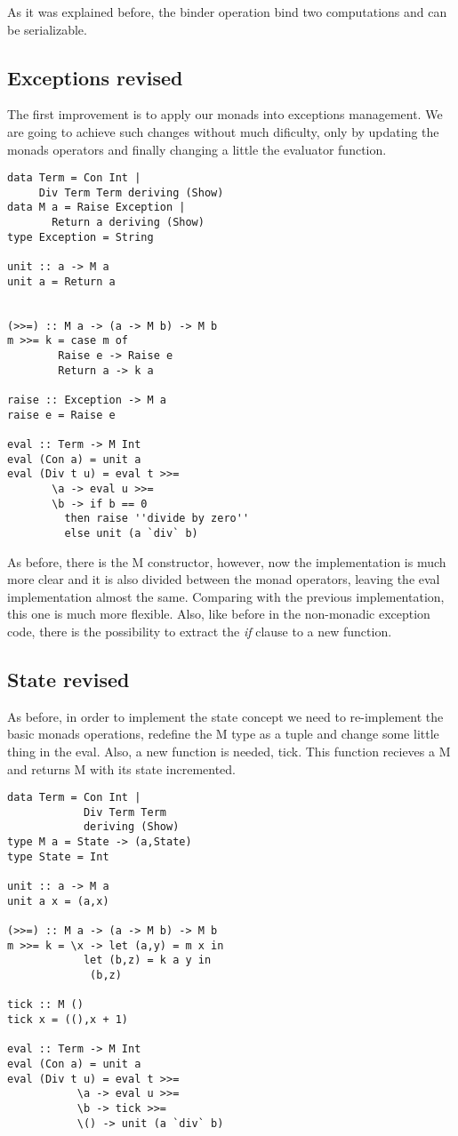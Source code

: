 \documentclass[twocolumn,10pt]{article}
\begin{document}
As it was explained before, the binder operation bind two computations and can be serializable.

\subsection{Exceptions revised}
The first improvement is to apply our monads into exceptions management. We are going to achieve such changes without much dificulty, only by updating the monads operators and finally changing a little the evaluator function.

\lstset{language=Haskell}
\begin{lstlisting}
data Term = Con Int | 
     Div Term Term deriving (Show)
data M a = Raise Exception | 
	   Return a deriving (Show)
type Exception = String

unit :: a -> M a
unit a = Return a


(>>=) :: M a -> (a -> M b) -> M b
m >>= k = case m of
		Raise e -> Raise e
		Return a -> k a

raise :: Exception -> M a
raise e = Raise e

eval :: Term -> M Int
eval (Con a) = unit a
eval (Div t u) = eval t >>= 
	   \a -> eval u >>= 
	   \b -> if b == 0
         then raise ''divide by zero''
         else unit (a `div` b)
\end{lstlisting}

As before, there is the M constructor, however, now the implementation is much more clear and it is also divided between the monad operators, leaving the eval implementation almost the same. Comparing with the previous implementation, this one is much more flexible. Also, like before in the non-monadic exception code, there is the possibility to extract the \textit{if} clause to a new function.

\subsection{State revised}
As before, in order to implement the state concept we need to re-implement the basic monads operations, redefine the M type as a tuple and change some little thing in the eval. Also, a new function is needed, tick. This function recieves a M and returns M with its state incremented.

\lstset{language=Haskell}
\begin{lstlisting}
data Term = Con Int | 
            Div Term Term 
            deriving (Show)
type M a = State -> (a,State)
type State = Int

unit :: a -> M a
unit a x = (a,x)

(>>=) :: M a -> (a -> M b) -> M b
m >>= k = \x -> let (a,y) = m x in
	        let (b,z) = k a y in
	         (b,z)

tick :: M ()
tick x = ((),x + 1)

eval :: Term -> M Int
eval (Con a) = unit a
eval (Div t u) = eval t >>= 
           \a -> eval u >>= 
           \b -> tick >>= 
           \() -> unit (a `div` b)
\end{lstlisting}
\end{document}
